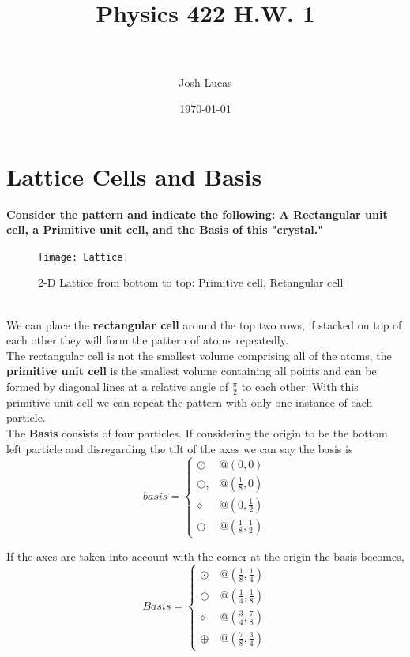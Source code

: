 \documentclass[paper=a4, fontsize=11pt]{scrartcl} %
\title{	
\normalfont \normalsize  %
\horrule{0.5pt} \\[0.4cm] %
\huge Physics 422 H.W. 1\\ %
\horrule{2pt} \\[0.5cm] %
}
\author{Josh Lucas} %
\date{\normalsize\today} %
\numberwithin{equation}{section} %
\numberwithin{figure}{section} %
\numberwithin{table}{section} %
\begin{document}
\maketitle %


\section{Lattice Cells and Basis}
\textbf{Consider the pattern and indicate the following: A \textbf{Rectangular unit cell}, a \textbf{Primitive unit cell}, and the \textbf{Basis} of this "crystal."}\\
\begin{figure}
\texttt{[image: Lattice]}
\caption{2-D Lattice from bottom to top: Primitive cell, Retangular cell}
\end{figure}\\
We can place the \textbf{rectangular cell} around the top two rows, if stacked on top of each other they will form the pattern of atoms repeatedly.\\ The rectangular cell is not the smallest volume comprising all of the atoms, the \textbf{primitive unit cell} is the smallest volume containing all points and can be formed by diagonal lines at a relative angle of $\frac{\pi}{2}$ to each other. With this primitive unit cell we can repeat the pattern with only one instance of each particle.\\
The \textbf{Basis} consists of four particles. If considering the origin to be the bottom left particle and disregarding the tilt of the axes we can say the basis is 
\begin{equation*}
basis = \begin{cases} \odot\  & @ (0,0) \\ \bigcirc , & @ (\frac{1}{8},0) \\ \diamond & @ (0,\frac{1}{2}) \\ \oplus &  @(\frac{1}{8},\frac{1}{2}) \end{cases}
\end{equation*} 

If the axes are taken into account with the corner at the origin the basis becomes,
\begin{equation*}
 Basis= \begin{cases} \odot\  & @ (\frac{1}{8},\frac{1}{4}) \\ \bigcirc  & @ (\frac{1}{4},\frac{1}{8}) \\ \diamond & @ (\frac{3}{4},\frac{7}{8}) \\ \oplus &  @(\frac{7}{8},\frac{3}{4}) \end{cases}
\end{equation*} 
\end{document}
